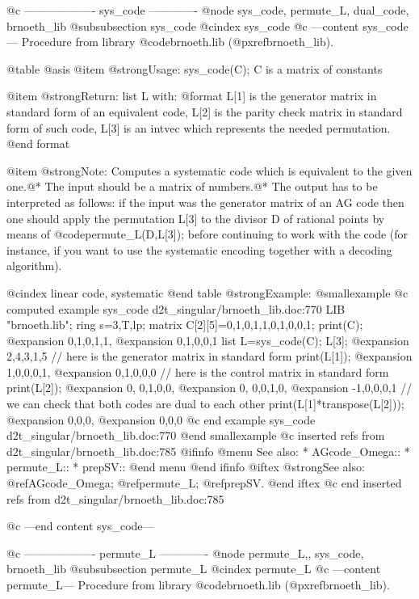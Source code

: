 @c ------------------- sys_code -------------
@node sys_code, permute_L, dual_code, brnoeth_lib
@subsubsection sys_code
@cindex sys_code
@c ---content sys_code---
Procedure from library @code{brnoeth.lib} (@pxref{brnoeth_lib}).

@table @asis
@item @strong{Usage:}
sys_code(C); C is a matrix of constants

@item @strong{Return:}
list L with:
   @format
   L[1] is the generator matrix in standard form of an equivalent code,
   L[2] is the parity check matrix in standard form of such code,
   L[3] is an intvec which represents the needed permutation.
   @end format

@item @strong{Note:}
Computes a systematic code which is equivalent to the given one.@*
The input should be a matrix of numbers.@*
The output has to be interpreted as follows: if the input was
the generator matrix of an AG code then one should apply the
permutation L[3] to the divisor D of rational points by means
of @code{permute_L(D,L[3]);} before continuing to work with the
code (for instance, if you want to use the systematic encoding
together with a decoding algorithm).

@cindex linear code, systematic
@end table
@strong{Example:}
@smallexample
@c computed example sys_code d2t_singular/brnoeth_lib.doc:770 
LIB "brnoeth.lib";
ring s=3,T,lp;
matrix C[2][5]=0,1,0,1,1,0,1,0,0,1;
print(C);
@expansion{} 0,1,0,1,1,
@expansion{} 0,1,0,0,1 
list L=sys_code(C);
L[3];
@expansion{} 2,4,3,1,5
// here is the generator matrix in standard form
print(L[1]);
@expansion{} 1,0,0,0,1,
@expansion{} 0,1,0,0,0 
// here is the control matrix in standard form
print(L[2]);
@expansion{} 0, 0,1,0,0,
@expansion{} 0, 0,0,1,0,
@expansion{} -1,0,0,0,1 
// we can check that both codes are dual to each other
print(L[1]*transpose(L[2]));
@expansion{} 0,0,0,
@expansion{} 0,0,0 
@c end example sys_code d2t_singular/brnoeth_lib.doc:770
@end smallexample
@c inserted refs from d2t_singular/brnoeth_lib.doc:785
@ifinfo
@menu
See also:
* AGcode_Omega::
* permute_L::
* prepSV::
@end menu
@end ifinfo
@iftex
@strong{See also:}
@ref{AGcode_Omega};
@ref{permute_L};
@ref{prepSV}.
@end iftex
@c end inserted refs from d2t_singular/brnoeth_lib.doc:785

@c ---end content sys_code---

@c ------------------- permute_L -------------
@node permute_L,, sys_code, brnoeth_lib
@subsubsection permute_L
@cindex permute_L
@c ---content permute_L---
Procedure from library @code{brnoeth.lib} (@pxref{brnoeth_lib}).


